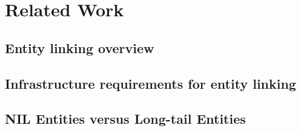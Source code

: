 \section{Related Work} %
\subsection{Entity linking overview} %






\subsection{Infrastructure requirements for entity linking}
\subsection{NIL Entities versus Long-tail Entities}
